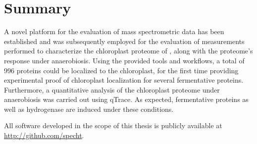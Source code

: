 \cleardoublepage
\chapter{Summary}

A novel platform for the evaluation of mass spectrometric data has been
established and was subsequently employed for the evaluation of measurements
performed to characterize the chloroplast proteome of \cre, along with
the proteome's response under anaerobiosis.
Using the provided tools and workflows, a total of 996 proteins could be 
localized to the chloroplast, for the first time providing experimental proof 
of chloroplast localization for several fermentative proteins.
Furthermore, a quantitative analysis of the chloroplast proteome under 
anaerobiosis was carried out using qTrace.
As expected, fermentative proteins as well as hydrogenase are induced under
these conditions.

All software developed in the scope of this thesis is publicly available
at \href{http://github.com/specht}{http://github.com/specht}.
